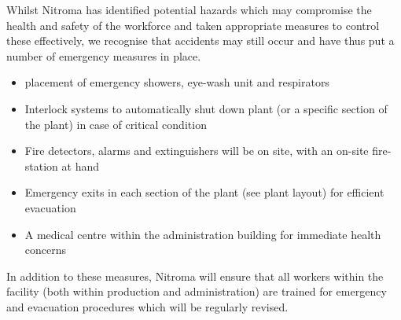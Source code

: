 Whilst Nitroma has identified potential hazards which may compromise the health and safety of the workforce and taken appropriate measures to control these effectively, we recognise that accidents may still occur and have thus put a number of emergency measures in place. 
 
\begin{itemize}
    \item placement of emergency showers, eye-wash unit and respirators
\item Interlock systems to automatically shut down plant (or a specific section of the plant) in case of critical condition 
\item Fire detectors, alarms and extinguishers will be on site, with an on-site fire-station at hand
    \item Emergency exits in each section of the plant (see plant layout) for efficient evacuation 
\item  A medical centre within the administration building for immediate health concerns
\end{itemize}

In addition to these measures, Nitroma will ensure that all workers within the facility (both within production and administration) are trained for emergency and evacuation procedures which will be regularly revised. 




 